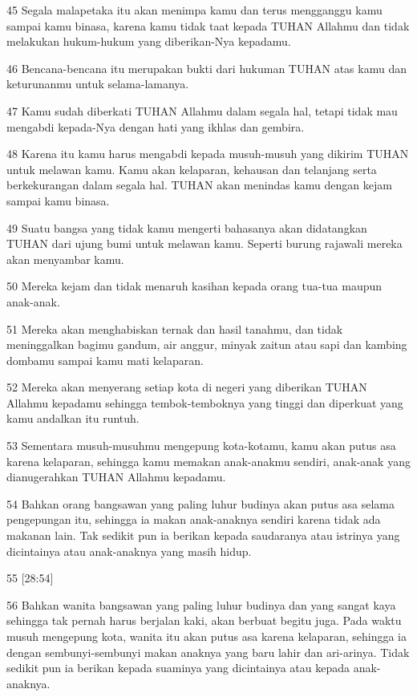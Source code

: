 \par 45 Segala malapetaka itu akan menimpa kamu dan terus mengganggu kamu sampai kamu binasa, karena kamu tidak taat kepada TUHAN Allahmu dan tidak melakukan hukum-hukum yang diberikan-Nya kepadamu.
\par 46 Bencana-bencana itu merupakan bukti dari hukuman TUHAN atas kamu dan keturunanmu untuk selama-lamanya.
\par 47 Kamu sudah diberkati TUHAN Allahmu dalam segala hal, tetapi tidak mau mengabdi kepada-Nya dengan hati yang ikhlas dan gembira.
\par 48 Karena itu kamu harus mengabdi kepada musuh-musuh yang dikirim TUHAN untuk melawan kamu. Kamu akan kelaparan, kehausan dan telanjang serta berkekurangan dalam segala hal. TUHAN akan menindas kamu dengan kejam sampai kamu binasa.
\par 49 Suatu bangsa yang tidak kamu mengerti bahasanya akan didatangkan TUHAN dari ujung bumi untuk melawan kamu. Seperti burung rajawali mereka akan menyambar kamu.
\par 50 Mereka kejam dan tidak menaruh kasihan kepada orang tua-tua maupun anak-anak.
\par 51 Mereka akan menghabiskan ternak dan hasil tanahmu, dan tidak meninggalkan bagimu gandum, air anggur, minyak zaitun atau sapi dan kambing dombamu sampai kamu mati kelaparan.
\par 52 Mereka akan menyerang setiap kota di negeri yang diberikan TUHAN Allahmu kepadamu sehingga tembok-temboknya yang tinggi dan diperkuat yang kamu andalkan itu runtuh.
\par 53 Sementara musuh-musuhmu mengepung kota-kotamu, kamu akan putus asa karena kelaparan, sehingga kamu memakan anak-anakmu sendiri, anak-anak yang dianugerahkan TUHAN Allahmu kepadamu.
\par 54 Bahkan orang bangsawan yang paling luhur budinya akan putus asa selama pengepungan itu, sehingga ia makan anak-anaknya sendiri karena tidak ada makanan lain. Tak sedikit pun ia berikan kepada saudaranya atau istrinya yang dicintainya atau anak-anaknya yang masih hidup.
\par 55 [28:54]
\par 56 Bahkan wanita bangsawan yang paling luhur budinya dan yang sangat kaya sehingga tak pernah harus berjalan kaki, akan berbuat begitu juga. Pada waktu musuh mengepung kota, wanita itu akan putus asa karena kelaparan, sehingga ia dengan sembunyi-sembunyi makan anaknya yang baru lahir dan ari-arinya. Tidak sedikit pun ia berikan kepada suaminya yang dicintainya atau kepada anak-anaknya.
